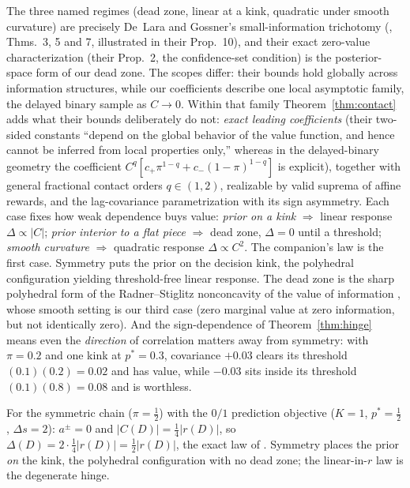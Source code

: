 \documentclass[acmsmall,screen,review,anonymous]{acmart}
\begin{document}
\begin{remark}\label{rem:trichotomy}
The three named regimes (dead zone, linear at a kink, quadratic under
smooth curvature) are precisely De~Lara and Gossner's small-information
trichotomy (\cite{delaragossner}, Thms.~3, 5 and 7, illustrated in their
Prop.~10), and their exact zero-value
characterization (their Prop.~2, the confidence-set condition) is the
posterior-space form of our dead zone. The scopes differ: their bounds hold
globally across information structures, while our coefficients describe
one local asymptotic family, the delayed binary sample as $C\to0$. Within
that family Theorem~\ref{thm:contact} adds
what their bounds deliberately do not: \emph{exact leading coefficients}
(their two-sided constants ``depend on the global behavior of the
value function, and hence cannot be inferred from local properties only,''
whereas in the delayed-binary geometry the coefficient
$C^q[c_+\pi^{1-q}+c_-(1-\pi)^{1-q}]$ is explicit), together with
general fractional contact orders $q\in(1,2)$, realizable by valid
suprema of affine rewards, and the lag-covariance parametrization with
its sign asymmetry. Each case fixes how weak
dependence buys value: \emph{prior on a kink}
$\Rightarrow$ linear response $\Delta\propto|C|$; \emph{prior interior to a
flat piece} $\Rightarrow$ dead zone, $\Delta=0$ until a threshold;
\emph{smooth curvature} $\Rightarrow$ quadratic response
$\Delta\propto C^2$. The companion's law is the first case. Symmetry
puts the prior on the decision kink, the polyhedral configuration
yielding threshold-free linear response. The dead zone is the sharp polyhedral form of the
Radner--Stiglitz nonconcavity of the value of information
\cite{radnerstiglitz84,chadeschlee02}, whose smooth setting is our third case (zero
marginal value at zero information, but not identically zero). And the
sign-dependence of Theorem~\ref{thm:hinge} means even the \emph{direction}
of correlation matters away from symmetry: with $\pi=0.2$ and one kink at
$p^*=0.3$, covariance $+0.03$ clears its threshold $(0.1)(0.2)=0.02$ and
has value, while $-0.03$ sits inside its threshold $(0.1)(0.8)=0.08$ and is
worthless.
\end{remark}

\begin{corollary}
For the symmetric chain ($\pi=\tfrac12$) with the $0/1$ prediction
objective ($K{=}1$, $p^*=\tfrac12$, $\Delta s=2$):
$a^{\pm}=0$ and $|C(D)|=\tfrac14 |r(D)|$, so
$\Delta(D)=2\cdot\tfrac14 |r(D)|=\tfrac12 |r(D)|$, the exact law of
\cite{infocom}. Symmetry places the prior \emph{on} the kink, the polyhedral
configuration with no dead zone; the linear-in-$r$ law is the degenerate
hinge.
\end{corollary}
\end{document}
